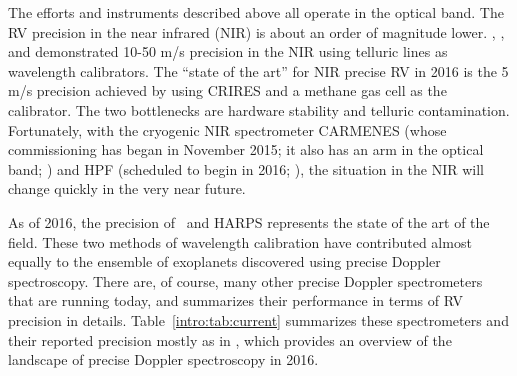 The efforts and instruments described above all operate in the optical
band. The RV precision in the near infrared (NIR) is about an order of
magnitude lower. \cite{2010ApJ...723..684B},
\cite{2010A&A...511A..55F}, and \cite{2012ApJ...749...16B}
demonstrated 10-50 m/s precision in the NIR using telluric lines as
wavelength calibrators. The ``state of the art'' for NIR precise RV in
2016 is the 5 m/s precision achieved by \cite{2010ApJ...713..410B}
using CRIRES and a methane gas cell as the calibrator. The two
bottlenecks are hardware stability and telluric
contamination. Fortunately, with the cryogenic NIR spectrometer
CARMENES (whose commissioning has began in November 2015; it also has
an arm in the optical band; \citealt{2014SPIE.9147E..1FQ}) and HPF
(scheduled to begin in 2016; \citealt{2012SPIE.8446E..1SM}), the
situation in the NIR will change quickly in the very near future.

As of 2016, the precision of \keck\ and HARPS represents the state of
the art of the field. These two methods of wavelength calibration have
contributed almost equally to the ensemble of exoplanets discovered
using precise Doppler spectroscopy. There are, of course, many other
precise Doppler spectrometers that are running today, and
\cite{eprv2015} summarizes their performance in terms of RV precision
in details. Table~\ref{intro:tab:current} summarizes these
spectrometers and their reported precision mostly as in
\cite{eprv2015}, which provides an overview of the landscape of
precise Doppler spectroscopy in 2016.

